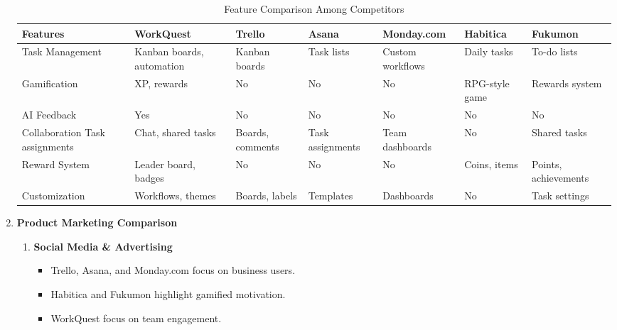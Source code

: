 \begin{enumerate}
    \noindent\begin{center}
    \begin{table}[ht]
        \centering
        \footnotesize 
        \begin{tabularx}{\textwidth}{|>{\raggedright\arraybackslash}X|>{\raggedright\arraybackslash}X|>{\raggedright\arraybackslash}X|>{\raggedright\arraybackslash}X|>{\raggedright\arraybackslash}X|>{\raggedright\arraybackslash}X|>{\raggedright\arraybackslash}X|}        
            \hline
            \rowcolor{gray!70}
            Features & WorkQuest & Trello & Asana & Monday.com & Habitica & Fukumon \\
            \hline
            Task Management & Kanban boards, automation & Kanban boards & Task lists & Custom workflows & Daily tasks & To-do lists \\
            \hline
            Gamification & XP, rewards & No & No & No & RPG-style game & Rewards system \\
            \hline
            AI Feedback & Yes & No & No & No & No & No \\
            \hline
            Collaboration Task assignments & Chat, shared tasks & Boards, comments & Task assignments & Team dashboards & No & Shared tasks \\
            \hline
            Reward System & Leader board, badges & No & No & No & Coins, items & Points, achievements \\
            \hline
            Customization & Workflows, themes & Boards, labels & Templates & Dashboards & No & Task settings \\
            \hline
        \end{tabularx}
        \caption{Feature Comparison Among Competitors}
        \label{tab:feature-comparison}
    \end{table}
\end{center}

\item \textbf{Product Marketing Comparison}
    \begin{enumerate}
        \item \textbf{Social Media \& Advertising}
        \begin{itemize}
            \item Trello, Asana, and Monday.com focus on business users.
            \item Habitica and Fukumon highlight gamified motivation.
            \item WorkQuest focus on team engagement.
        \end{itemize}
        

\end{enumerate}
\end{enumerate}
